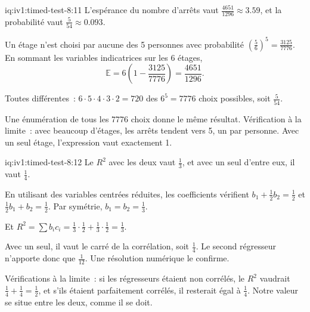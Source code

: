 \begin{solution}{iq:iv1:timed-test-8:11}
L'espérance du nombre d'arrêts vaut $\frac{4651}{1296} \approx 3.59$, et la probabilité vaut $\frac{5}{54} \approx 0.093$.

Un étage n'est choisi par aucune des 5 personnes avec probabilité $(\frac56)^5 = \frac{3125}{7776}$. En sommant les variables indicatrices sur les 6 étages,
\[
\mathbb{E} = 6\left(1 - \frac{3125}{7776}\right) = \frac{4651}{1296}.
\]

Toutes différentes~: $6 \cdot 5 \cdot 4 \cdot 3 \cdot 2 = 720$ des $6^5 = 7776$ choix possibles, soit $\frac{5}{54}$.

Une énumération de tous les 7776 choix donne le même résultat. Vérification à la limite~: avec beaucoup d'étages, les arrêts tendent vers 5, un par personne. Avec un seul étage, l'expression vaut exactement 1.

\end{solution}

\begin{solution}{iq:iv1:timed-test-8:12}
Le $R^2$ avec les deux vaut $\frac13$, et avec un seul d'entre eux, il vaut $\frac14$.

En utilisant des variables centrées réduites, les coefficients vérifient $b_1 + \frac12b_2 = \frac12$ et $\frac12b_1 + b_2 = \frac12$. Par symétrie, $b_1 = b_2 = \frac13$.

Et $R^2 = \sum b_ic_i = \frac13 \cdot \frac12 + \frac13 \cdot \frac12 = \frac13$.

Avec un seul, il vaut le carré de la corrélation, soit $\frac14$. Le second régresseur n'apporte donc que $\frac{1}{12}$. Une résolution numérique le confirme.

Vérifications à la limite~: si les régresseurs étaient non corrélés, le $R^2$ vaudrait $\frac14 + \frac14 = \frac12$, et s'ils étaient parfaitement corrélés, il resterait égal à $\frac14$. Notre valeur se situe entre les deux, comme il se doit.

\end{solution}
